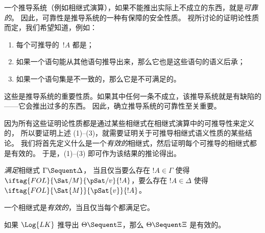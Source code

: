 \documentclass[../../../include/open-logic-section]{subfiles}
\begin{document}
      {}
      {}


\begin{explain}
一个推导系统（例如相继式演算），如果不能推出实际上不成立的东西，就是\emph{可靠的}。
因此，可靠性是推导系统的一种有保障的安全性质。
视所讨论的证明论性质而定，我们希望知道，例如：
\begin{enumerate}
\item 每个可推导的~$!A$ 都是；
\item 如果一个语句能从其他语句推导出来，那么它也是这些语句的语义后承；
\item 如果一个语句集是不一致的，那么它是不可满足的。
\end{enumerate}
这些是推导系统的重要性质。如果其中任何一条不成立，该推导系统就是有缺陷的——它会推出过多的东西。
因此，确立推导系统的可靠性至关重要。

因为所有这些证明论性质都是通过某些相继式在相继式演算中的可推导性来定义的，
所以要证明上述 (1)--(3)，就需要证明关于可推导相继式语义性质的某些结论。
我们将首先定义什么是一个\emph{有效的}相继式，然后证明每个可推导的相继式都是有效的。
于是，(1)--(3) 即可作为该结果的推论得出。
\end{explain}

\begin{defn}
\emph{满足}相继式 $\Gamma \Sequent \Delta$，
当且仅当要么存在 $!A \in \Gamma$ 使得 $\iftag{FOL}{\Sat/{M}}{\pSat/{v}}{!A}$，要么存在 $!A \in \Delta$ 使得 $\iftag{FOL}{\Sat{M}}{\pSat{v}}{!A}$。

一个相继式是\emph{有效的}，当且仅当每个都满足它。
\end{defn}

\begin{thm}[可靠性]
 如果 $\Log{LK}$ 推导出 $\Theta \Sequent \Xi$，那么 $\Theta \Sequent \Xi$ 是有效的。
\end{thm}
\end{document}
